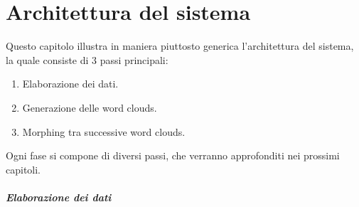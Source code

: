 \onehalfspacing


\chapter{Architettura del sistema}

Questo capitolo illustra in maniera piuttosto generica l'architettura del sistema, la quale consiste di 3 passi principali: 
\begin{enumerate}
\item Elaborazione dei dati.
\item Generazione delle word clouds.
\item Morphing tra successive word clouds.
\end{enumerate}
Ogni fase si compone di diversi passi, che verranno approfonditi nei prossimi capitoli.

\paragraph{Elaborazione dei dati}
